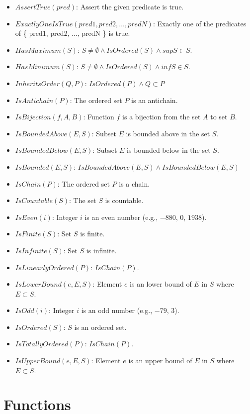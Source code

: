 \documentclass[12pt, letterpaper, oneside]{book}
\begin{document}
\begin{itemize}
  \item $AssertTrue(pred)$: Assert the given predicate is true.
  \item $ExactlyOneIsTrue(pred1, pred2, \ldots, predN)$: Exactly one of the predicates of \{ pred1, pred2, $\ldots$,
        predN \} is true.
  \item $HasMaximum(S)$: $S \ne \emptyset \land IsOrdered(S) \land sup S \in S$.
  \item $HasMinimum(S)$: $S \ne \emptyset \land IsOrdered(S) \land inf S \in S$.
  \item $InheritsOrder(Q, P)$: $IsOrdered(P) \land Q \subset P$
  \item $IsAntichain(P)$: The ordered set $P$ is an antichain.
  \item $IsBijection(f, A, B)$: Function $f$ is a bijection from the set $A$ to set $B$.
  \item $IsBoundedAbove(E, S)$: Subset $E$ is bounded above in the set $S$.
  \item $IsBoundedBelow(E, S)$: Subset $E$ is bounded below in the set $S$.
  \item $IsBounded(E, S)$: $IsBoundedAbove(E, S) \land IsBoundedBelow(E, S)$
  \item $IsChain(P)$: The ordered set $P$ is a chain.
  \item $IsCountable(S)$: The set $S$ is countable.
  \item $IsEven(i)$: Integer $i$ is an even number (e.g., $-880$, $0$, $1938$).
  \item $IsFinite(S)$: Set $S$ is finite.
  \item $IsInfinite(S)$: Set $S$ is infinite.
  \item $IsLinearlyOrdered(P)$: $IsChain(P)$.
  \item $IsLowerBound(e, E, S)$: Element $e$ is an lower bound of $E$ in $S$ where $E \subset S$.
  \item $IsOdd(i)$: Integer $i$ is an odd number (e.g., $-79$, $3$).
  \item $IsOrdered(S)$: $S$ is an ordered set.
  \item $IsTotallyOrdered(P)$: $IsChain(P)$.
  \item $IsUpperBound(e, E, S)$: Element $e$ is an upper bound of $E$ in $S$ where $E \subset S$.
\end{itemize}

%
\chapter{Functions}
%
\end{document}
